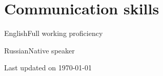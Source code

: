 \documentclass{tccv}
\newcommand{\updateinfo}[1][\today]{\par\vfill\hfill{\scriptsize\color{darkergray}Last updated on #1}}
\begin{document}
\section{Communication skills}

\begin{factlist}
\item{English}{Full working proficiency}
\item{Russian}{Native speaker}
\end{factlist}

\nocite{kirillova2022erqa}
\nocite{lyapustin2022towards}

\printbibliography[title={Publications}]

\updateinfo
\end{document}
